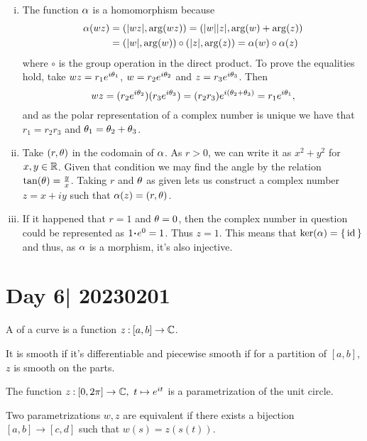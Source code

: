 \documentclass[12pt]{memoir}
\begin{document}
\begin{ptcbr}
    \begin{enumerate}[i)]
        \itemsep=-0.4em
        \item The function $\alpha$ is a homomorphism because 
        \begin{align*}
            \alpha(wz)&=(|wz|,\arg(wz))=(|w||z|,\arg(w)+\arg(z))\\
        &=(|w|,\arg(w))\circ(|z|,\arg(z))=\alpha(w)\circ\alpha(z)
        \end{align*}
        where $\circ$ is the group operation in the direct product. To prove the equalities hold, take $wz=r_1e^{i\theta_1}$, $w=r_2e^{i\theta_2}$ and $z=r_3e^{i\theta_3}$. Then 
        $$wz=(r_2e^{i\theta_2})(r_3e^{i\theta_3})=(r_2r_3)e^{i(\theta_2+\theta_3)}=r_1e^{i\theta_1},$$
        and as the polar representation of a complex number is unique we have that $r_1=r_2r_3$ and $\theta_1=\theta_2+\theta_3$.
        \item Take $(r,\theta)$ in the codomain of $\alpha$. As $r>0$, we can write it as $x^2+y^2$ for $x,y\in\mathbb{R}$. Given that condition we may find the angle by the relation $\tan(\theta)=\frac{y}{x}$. Taking $r$ and $\theta$ as given lets us construct a complex number $z=x+iy$ such that $\alpha(z)=(r,\theta)$.
        \item If it happened that $r=1$ and $\theta=0$, then the complex number in question could be represented as $1\.e^0=1$. Thus $z=1$. This means that $\ker(\alpha)=\{\,\operatorname{id}\,\}$ and thus, as $\alpha$ is a morphism, it's also injective.
    \end{enumerate}
\end{ptcbr}

\section{Day 6| 20230201}

\begin{Def}
    A  of a curve is a function $z\mathbin{:} [a,b]\to\mathbb{C}$.\par 
    It is smooth if it's differentiable and piecewise smooth if for a partition of $[a,b]$, $z$ is smooth on the parts.
\end{Def}

\begin{Ex}
    The function $z\mathbin{:}[0,2\pi]\to\mathbb{C},\ t\mapsto e^{it}$ is a parametrization of the unit circle. 
\end{Ex}

\begin{Def}
    Two parametrizations $w,z$ are equivalent if there exists a bijection $[a,b]\to[c,d]$ such that $w(s)=z(s(t))$.
\end{Def}
\end{document}
